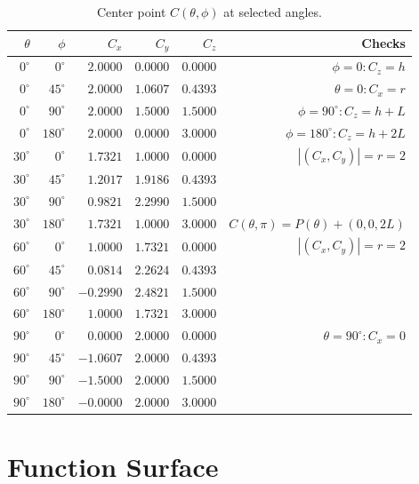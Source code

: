 \documentclass[12pt,a4paper]{article}
\begin{document}
\begin{table}[H]
  \centering
  \caption{Center point $C(\theta,\phi)$ at selected angles.\label{tab:verify}}
  \begin{tabular}{@{}rrrrrr@{}}
    \toprule
    $\theta$ & $\phi$ & $C_x$ & $C_y$ & $C_z$ & Checks \\
    \midrule
    $0^\circ$  & $0^\circ$   & $2.0000$ & $0.0000$ & $0.0000$ & $\phi=0\colon C_z=h$ \\
    $0^\circ$  & $45^\circ$  & $2.0000$ & $1.0607$ & $0.4393$ & $\theta=0\colon C_x=r$ \\
    $0^\circ$  & $90^\circ$  & $2.0000$ & $1.5000$ & $1.5000$ & $\phi=90^\circ\colon C_z=h+L$ \\
    $0^\circ$  & $180^\circ$ & $2.0000$ & $0.0000$ & $3.0000$ & $\phi=180^\circ\colon C_z=h+2L$ \\
    $30^\circ$ & $0^\circ$   & $1.7321$ & $1.0000$ & $0.0000$ & $|(C_x,C_y)|=r=2$ \\
    $30^\circ$ & $45^\circ$  & $1.2017$ & $1.9186$ & $0.4393$ & \\
    $30^\circ$ & $90^\circ$  & $0.9821$ & $2.2990$ & $1.5000$ & \\
    $30^\circ$ & $180^\circ$ & $1.7321$ & $1.0000$ & $3.0000$ & $C(\theta,\pi)=P(\theta)+(0,0,2L)$ \\
    $60^\circ$ & $0^\circ$   & $1.0000$ & $1.7321$ & $0.0000$ & $|(C_x,C_y)|=r=2$ \\
    $60^\circ$ & $45^\circ$  & $0.0814$ & $2.2624$ & $0.4393$ & \\
    $60^\circ$ & $90^\circ$  & $-0.2990$& $2.4821$ & $1.5000$ & \\
    $60^\circ$ & $180^\circ$ & $1.0000$ & $1.7321$ & $3.0000$ & \\
    $90^\circ$ & $0^\circ$   & $0.0000$ & $2.0000$ & $0.0000$ & $\theta=90^\circ\colon C_x=0$ \\
    $90^\circ$ & $45^\circ$  & $-1.0607$& $2.0000$ & $0.4393$ & \\
    $90^\circ$ & $90^\circ$  & $-1.5000$& $2.0000$ & $1.5000$ & \\
    $90^\circ$ & $180^\circ$ & $-0.0000$& $2.0000$ & $3.0000$ & \\
    \bottomrule
  \end{tabular}
\end{table}

\section{Function Surface}
\end{document}
